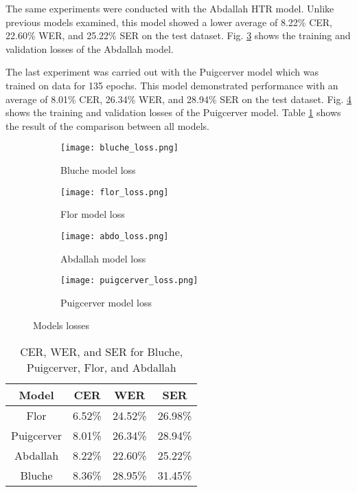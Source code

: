 \documentclass[preprint,12pt]{elsarticle}
\begin{document}
The same experiments were conducted with the Abdallah HTR model. Unlike previous models examined, this model showed a lower average of 8.22\% CER, 22.60\% WER, and 25.22\% SER on the test dataset. Fig. \ref{fig:abdo_loss} shows the training and validation losses of the Abdallah model.

The last experiment was carried out with the Puigcerver model which was trained on data for 135 epochs. This model demonstrated performance with an average of 8.01\% CER, 26.34\%  WER, and 28.94\% SER on the test dataset. Fig. \ref{fig:puigcerver_loss} shows the training and validation losses of the Puigcerver model. Table \ref{tab:Bluche_Puigcerver} shows the result of the comparison between all models.

\begin{figure}[h!]
    \begin{subfigure}{0.50\columnwidth}
        \texttt{[image: bluche\_loss.png]}
        \caption{Bluche model loss}
        \label{fig:bluche_loss}
    \end{subfigure}
    \begin{subfigure}{0.50\columnwidth}
        \texttt{[image: flor\_loss.png]}
        \caption{Flor model loss}
        \label{fig:flor_loss}
    \end{subfigure}
    \begin{subfigure}{0.50\columnwidth}
        \texttt{[image: abdo\_loss.png]}
        \caption{Abdallah model loss}
        \label{fig:abdo_loss}
    \end{subfigure}
    \begin{subfigure}{0.50\columnwidth}
        \texttt{[image: puigcerver\_loss.png]}
        \caption{Puigcerver model loss}
        \label{fig:puigcerver_loss}
    \end{subfigure}
\caption{Models losses} 
\label{fig:model_losses}
\end{figure} 




\begin{table}[ht!]
\centering
	\caption{\footnotesize{CER, WER, and SER for Bluche, Puigcerver, Flor, and Abdallah }}
\begin{tabular}{|c|c|c|c|}
    \hline
    Model &   CER & WER & SER   \\
    \hline
    Flor  & 6.52\% & 24.52\%  &  26.98\% \\
    \hline
    Puigcerver  &  8.01\% & 26.34\% &28.94\% \\
    \hline
    Abdallah &  8.22\% & 22.60\%  & 25.22\%   \\
   
    \hline
     Bluche & 8.36\% & 28.95\%  & 31.45\% \\
    \hline

\end{tabular}


\label{tab:Bluche_Puigcerver}
\end{table}
\end{document}
